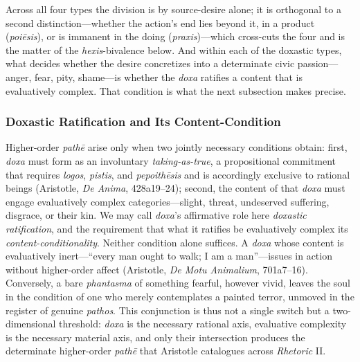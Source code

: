 \documentclass{article}
\begin{document}
Across all four types the division is by source-desire alone; it is orthogonal to a second distinction---whether the action's end lies beyond it, in a product (\textit{poiēsis}), or is immanent in the doing (\textit{praxis})---which cross-cuts the four and is the matter of the \textit{hexis}-bivalence below. And within each of the doxastic types, what decides whether the desire concretizes into a determinate civic passion---anger, fear, pity, shame---is whether the \textit{doxa} ratifies a content that is evaluatively complex. That condition is what the next subsection makes precise.


\subsubsection*{Doxastic Ratification and Its Content-Condition}

Higher-order \textit{pathē} arise only when two jointly necessary conditions obtain: first, \textit{doxa} must form as an involuntary \textit{taking-as-true}, a propositional commitment that requires \textit{logos}, \textit{pistis}, and \textit{pepoithēsis} and is accordingly exclusive to rational beings (Aristotle, \textit{De Anima}, 428a19--24); second, the content of that \textit{doxa} must engage evaluatively complex categories---slight, threat, undeserved suffering, disgrace, or their kin. We may call \textit{doxa}'s affirmative role here \textit{doxastic ratification}, and the requirement that what it ratifies be evaluatively complex its \textit{content-conditionality}. Neither condition alone suffices. A \textit{doxa} whose content is evaluatively inert---``every man ought to walk; I am a man''---issues in action without higher-order affect (Aristotle, \textit{De Motu Animalium}, 701a7--16). Conversely, a bare \textit{phantasma} of something fearful, however vivid, leaves the soul in the condition of one who merely contemplates a painted terror, unmoved in the register of genuine \textit{pathos}. This conjunction is thus not a single switch but a two-dimensional threshold: \textit{doxa} is the necessary rational axis, evaluative complexity is the necessary material axis, and only their intersection produces the determinate higher-order \textit{pathē} that Aristotle catalogues across \textit{Rhetoric} II.
\end{document}
